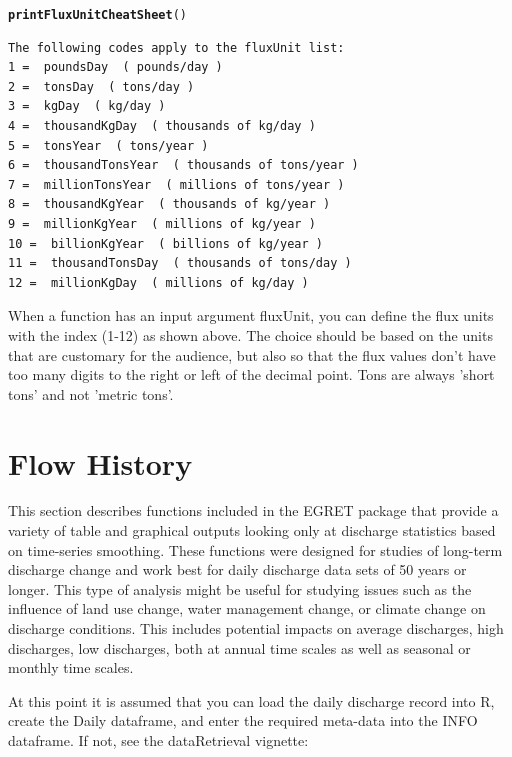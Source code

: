 \documentclass[a4paper,11pt]{article}\usepackage{graphicx, color}
\makeatletter
\newcommand{\hlfunctioncall}[1]{\textcolor[rgb]{0.501960784313725,0,0.329411764705882}{\textbf{#1}}}%
\newenvironment{kframe}{%
 \def\at@end@of@kframe{}%
 \ifinner\ifhmode%
  \def\at@end@of@kframe{\end{minipage}}%
  \begin{minipage}{\columnwidth}%
 \fi\fi%
 \def\FrameCommand##1{\hskip\@totalleftmargin \hskip-\fboxsep
 \colorbox{shadecolor}{##1}\hskip-\fboxsep
     \hskip-\linewidth \hskip-\@totalleftmargin \hskip\columnwidth}%
 \MakeFramed {\advance\hsize-\width
   \@totalleftmargin\z@ \linewidth\hsize
   \@setminipage}}%
 {\par\unskip\endMakeFramed%
 \at@end@of@kframe}
\newenvironment{knitrout}{}{} %
\makeatother
\begin{document}
\begin{knitrout}
\color{fgcolor}\begin{kframe}
\begin{alltt}
\hlfunctioncall{printFluxUnitCheatSheet}()
\end{alltt}
\begin{verbatim}
The following codes apply to the fluxUnit list:
1 =  poundsDay  ( pounds/day )
2 =  tonsDay  ( tons/day )
3 =  kgDay  ( kg/day )
4 =  thousandKgDay  ( thousands of kg/day )
5 =  tonsYear  ( tons/year )
6 =  thousandTonsYear  ( thousands of tons/year )
7 =  millionTonsYear  ( millions of tons/year )
8 =  thousandKgYear  ( thousands of kg/year )
9 =  millionKgYear  ( millions of kg/year )
10 =  billionKgYear  ( billions of kg/year )
11 =  thousandTonsDay  ( thousands of tons/day )
12 =  millionKgDay  ( millions of kg/day )
\end{verbatim}
\end{kframe}
\end{knitrout}


When a function has an input argument fluxUnit, you can define the flux units with the index (1-12) as shown above. The choice should be based on the units that are customary for the audience, but also so that the flux values don't have too many digits to the right or left of the decimal point. Tons are always 'short tons' and not 'metric tons'.

\FloatBarrier

\section{Flow History}
\label{sec:flowHistory}
This section describes functions included in the EGRET package that provide a variety of table and graphical outputs looking only at discharge statistics based on time-series smoothing. These functions were designed for studies of long-term discharge change and work best for daily discharge data sets of 50 years or longer. This type of analysis might be useful for studying issues such as the influence of land use change, water management change, or climate change on discharge conditions.  This includes potential impacts on average discharges, high discharges, low discharges, both at annual time scales as well as seasonal or monthly time scales. 

At this point it is assumed that you can load the daily discharge record into R, create the Daily dataframe, and enter the required meta-data into the INFO dataframe. If not, see the dataRetrieval vignette:
\end{document}

